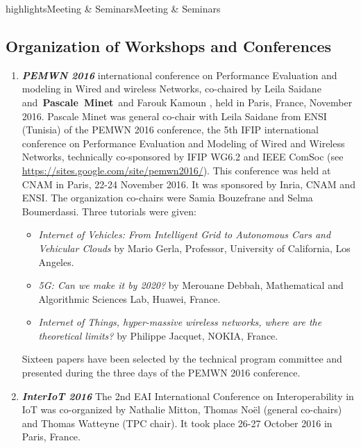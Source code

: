 \documentclass{ra2016}
\newcommand{\pascale}          {\textbf{Pascale~Minet}}
\begin{document}
\begin{module}{highlights}{Meeting \& Seminars}{Meeting \& Seminars}
\label{sec:meetingseminars}

\subsection{Organization of Workshops and Conferences}

\begin{enumerate}
    \item \textit{\textbf{PEMWN 2016}}
        international conference on Performance Evaluation and modeling in Wired and wireless Networks, co-chaired by Leila Saidane and~\pascale~and Farouk Kamoun , held in Paris, France, November 2016.
        Pascale Minet was general co-chair with Leila Saidane from ENSI (Tunisia) of the PEMWN 2016 conference, the 5th IFIP international conference on Performance Evaluation and Modeling of Wired and Wireless Networks, technically co-sponsored by IFIP WG6.2 and IEEE ComSoc (see \url{https://sites.google.com/site/pemwn2016/}).
        This conference was held at CNAM in Paris, 22-24 November 2016.
        It was sponsored by Inria, CNAM and ENSI.
        The organization co-chairs were Samia Bouzefrane and Selma Boumerdassi.
        Three tutorials were given:
        \begin{itemize}
            \item \emph{Internet of Vehicles: From Intelligent Grid to Autonomous Cars and Vehicular Clouds} by Mario Gerla, Professor, University of California, Los Angeles.
            \item \emph{5G: Can we make it by 2020?} by  Merouane Debbah,  Mathematical and Algorithmic Sciences Lab, Huawei, France.
            \item \emph{ Internet of Things, hyper-massive wireless networks, where are the theoretical limits?} by Philippe Jacquet, NOKIA, France.
        \end{itemize}
        Sixteen papers have been selected by the technical program committee and presented during the three days of the PEMWN 2016 conference.\\
    \item \textit{\textbf{InterIoT 2016}}
        The 2nd EAI International Conference on Interoperability in IoT was co-organized by Nathalie Mitton, Thomas No\"el (general co-chairs) and Thomas Watteyne (TPC chair).
        It took place 26-27 October 2016 in Paris, France.
\end{enumerate}


\end{module}
\end{document}
